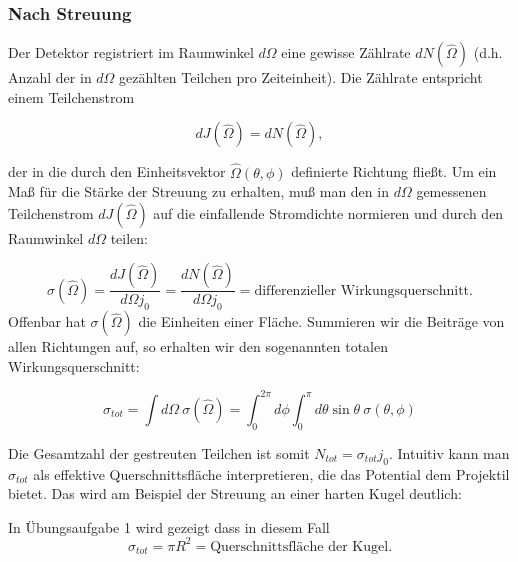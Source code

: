 \documentclass[10pt, letterpaper]{article}
\begin{document}
\subsubsection{Nach Streuung}

Der Detektor registriert im Raumwinkel $d\Omega$ eine gewisse Zählrate $dN(\hat{\Omega})$ (d.h. Anzahl der in $d\Omega$ gezählten Teilchen pro Zeiteinheit). Die Zählrate entspricht einem Teilchenstrom

\[
dJ(\hat{\Omega}) = dN(\hat{\Omega}),
\]

der in die durch den Einheitsvektor $\hat{\Omega}(\theta,\phi)$ definierte Richtung fließt. Um ein Maß für die Stärke der Streuung zu erhalten, muß man den in $d\Omega$ gemessenen Teilchenstrom $dJ(\hat{\Omega})$ auf die einfallende Stromdichte normieren und durch den Raumwinkel $d\Omega$ teilen:

\[
\sigma(\hat{\Omega}) = \frac{dJ(\hat{\Omega})}{d\Omega j_0} = \frac{dN(\hat{\Omega})}{d\Omega j_0} = \text{differenzieller Wirkungsquerschnitt.}
\]
Offenbar hat $\sigma(\hat{\Omega})$ die Einheiten einer Fläche. Summieren wir die Beiträge von allen Richtungen auf, so erhalten wir den sogenannten totalen Wirkungsquerschnitt:

\[
\sigma_{tot} = \int d\Omega\: \sigma(\hat{\Omega}) = \int_0^{2\pi} d\phi \int_0^{\pi} d\theta\sin\theta\: \sigma(\theta,\phi)
\]

Die Gesamtzahl der gestreuten Teilchen ist somit $N_{tot} = \sigma_{tot} j_0$. Intuitiv kann man $\sigma_{tot}$ als effektive Querschnittsfläche interpretieren, die das Potential dem Projektil bietet. Das wird am Beispiel der Streuung an einer harten Kugel deutlich:

\begin{center}
\end{center}

In Übungsaufgabe 1 wird gezeigt dass in diesem Fall
\[
\sigma_{tot} = \pi R^2 = \text{Querschnittsfläche der Kugel.}
\]
\end{document}
